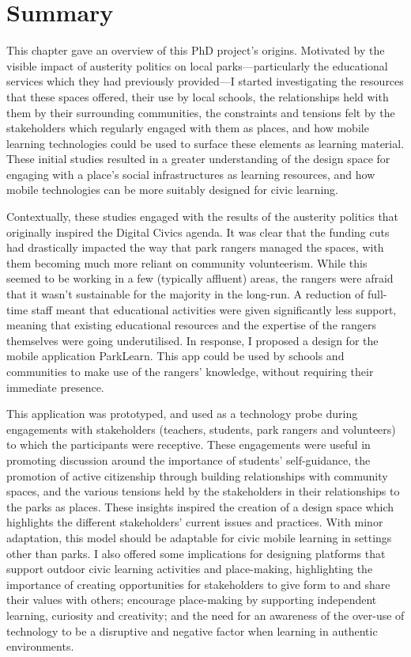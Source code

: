\section{Summary}

This chapter gave an overview of this PhD project's origins. Motivated by the visible impact of austerity politics on local parks---particularly the educational services which they had previously provided---I started investigating the resources that these spaces offered, their use by local schools, the relationships held with them by their surrounding communities, the constraints and tensions felt by the stakeholders which regularly engaged with them as places, and how mobile learning technologies could be used to surface these elements as learning material. These initial studies resulted in a greater understanding of the design space for engaging with a place's social infrastructures as learning resources, and how mobile technologies can be more suitably designed for civic learning.

Contextually, these studies engaged with the results of the austerity politics that originally inspired the Digital Civics agenda. It was clear that the funding cuts had drastically impacted the way that park rangers managed the spaces, with them becoming much more reliant on community volunteerism. While this seemed to be working in a few (typically affluent) areas, the rangers were afraid that it wasn't sustainable for the majority in the long-run. A reduction of full-time staff meant that educational activities were given significantly less support, meaning that existing educational resources and the expertise of the rangers themselves were going underutilised. In response, I proposed a design for the mobile application ParkLearn. This app could be used by schools and communities to make use of the rangers' knowledge, without requiring their immediate presence.

This application was prototyped, and used as a technology probe during engagements with stakeholders (teachers, students, park rangers and volunteers) to which the participants were receptive. These engagements were useful in promoting discussion around the importance of students' self-guidance, the promotion of active citizenship through building relationships with community spaces, and the various tensions held by the stakeholders in their relationships to the parks as places. These insights inspired the creation of a design space which highlights the different stakeholders’ current issues and practices. With minor adaptation, this model should be adaptable for civic mobile learning in settings other than parks. I also offered some implications for designing platforms that support outdoor civic learning activities and place-making, highlighting the importance of creating opportunities for stakeholders to give form to and share their values with others; encourage place-making by supporting independent learning, curiosity and creativity; and the need for an awareness of the over-use of technology to be a disruptive and negative factor when learning in authentic environments.

